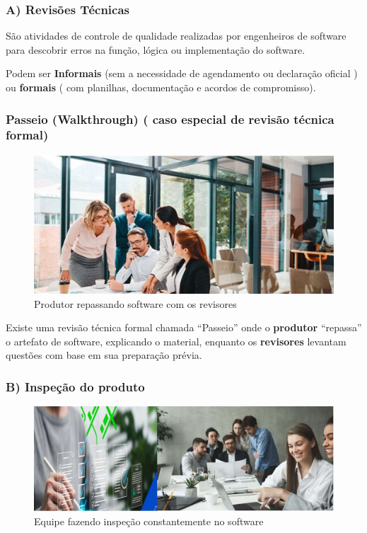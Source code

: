 \documentclass[
]{book}
\begin{document}
\subsubsection{A) Revisões Técnicas}\label{a-revisuxf5es-tuxe9cnicas}

São atividades de controle de qualidade realizadas por engenheiros de software para descobrir erros na função, lógica ou implementação do software.

Podem ser \textbf{Informais} (sem a necessidade de agendamento ou declaração oficial ) ou \textbf{formais} ( com planilhas, documentação e acordos de compromisso).

\subsubsection{Passeio (Walkthrough) ( caso especial de revisão técnica formal)}\label{passeio-walkthrough-caso-especial-de-revisuxe3o-tuxe9cnica-formal}

\begin{figure}
\centering
\includegraphics{images/passeio.jpg}
\caption{Produtor repassando software com os revisores}
\end{figure}

Existe uma revisão técnica formal chamada ``Passeio'' onde o \textbf{produtor} ``repassa'' o artefato de software, explicando o material, enquanto os \textbf{revisores} levantam questões com base em sua preparação prévia.

\subsubsection{B) Inspeção do produto}\label{b-inspeuxe7uxe3o-do-produto}

\begin{figure}
\centering
\includegraphics{images/inspecao.jpg}
\caption{Equipe fazendo inspeção constantemente no software}
\end{figure}
\end{document}
